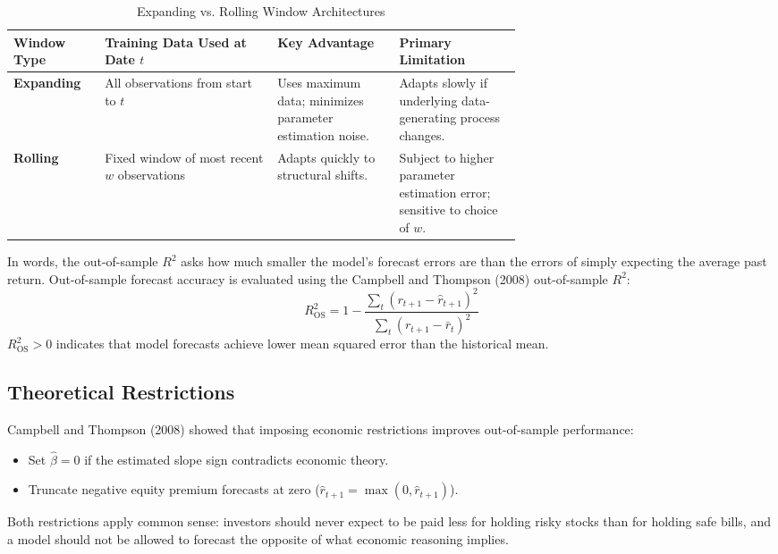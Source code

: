 \begin{table}[htbp]
\centering
\small
\caption{Expanding vs. Rolling Window Architectures}
\label{tab:09-windows}
\begin{tabularx}{0.95\linewidth}{@{}>{\raggedright\arraybackslash}p{0.18\linewidth}>{\raggedright\arraybackslash}X>{\raggedright\arraybackslash}p{0.24\linewidth}>{\raggedright\arraybackslash}p{0.24\linewidth}@{}}
\toprule
Window Type & Training Data Used at Date $t$ & Key Advantage & Primary Limitation \\
\midrule
\textbf{Expanding} & All observations from start to $t$ & Uses maximum data; minimizes parameter estimation noise. & Adapts slowly if underlying data-generating process changes. \\
\textbf{Rolling} & Fixed window of most recent $w$ observations & Adapts quickly to structural shifts. & Subject to higher parameter estimation error; sensitive to choice of $w$. \\
\bottomrule
\end{tabularx}
\end{table}

In words, the out-of-sample $R^2$ asks how much smaller the model's forecast errors are than the errors of simply expecting the average past return. Out-of-sample forecast accuracy is evaluated using the Campbell and Thompson (2008) out-of-sample $R^2$:
\begin{equation}
  R^2_{\text{OS}} = 1 - \frac{\sum_{t} \left( r_{t+1} - \hat{r}_{t+1} \right)^2}{\sum_{t} \left( r_{t+1} - \bar{r}_t \right)^2}
  \label{eq:09-r2os}
\end{equation}
$R^2_{\text{OS}} > 0$ indicates that model forecasts achieve lower mean squared error than the historical mean.

\subsection{Theoretical Restrictions}
Campbell and Thompson (2008) showed that imposing economic restrictions improves out-of-sample performance:
\begin{itemize}
  \item Set $\hat{\beta} = 0$ if the estimated slope sign contradicts economic theory.
  \item Truncate negative equity premium forecasts at zero ($\hat{r}_{t+1} = \max(0, \hat{r}_{t+1})$).
\end{itemize}
Both restrictions apply common sense: investors should never expect to be paid less for holding risky stocks than for holding safe bills, and a model should not be allowed to forecast the opposite of what economic reasoning implies.


